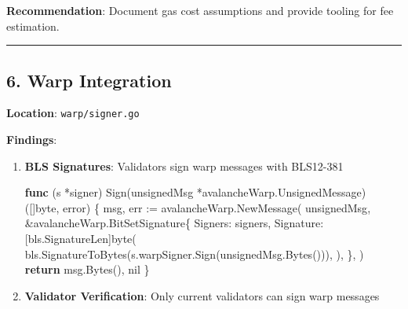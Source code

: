\documentclass[
]{article}
\newenvironment{Shaded}{}{}
\newcommand{\ControlFlowTok}[1]{\textcolor[rgb]{0.00,0.44,0.13}{\textbf{#1}}}
\newcommand{\DataTypeTok}[1]{\textcolor[rgb]{0.56,0.13,0.00}{#1}}
\newcommand{\KeywordTok}[1]{\textcolor[rgb]{0.00,0.44,0.13}{\textbf{#1}}}
\newcommand{\NormalTok}[1]{#1}
\newcommand{\OperatorTok}[1]{\textcolor[rgb]{0.40,0.40,0.40}{#1}}
\newcommand{\OtherTok}[1]{\textcolor[rgb]{0.00,0.44,0.13}{#1}}
\begin{document}
\textbf{Recommendation}: Document gas cost assumptions and provide
tooling for fee estimation.

\begin{center}\rule{0.5\linewidth}{0.5pt}\end{center}

\subsection{6. Warp Integration}\label{6-warp-integration}

\textbf{Location}: \texttt{warp/signer.go}

\textbf{Findings}:

\begin{enumerate}
\def\labelenumi{\arabic{enumi}.}
\item
  \textbf{BLS Signatures}: Validators sign warp messages with BLS12-381

\begin{Shaded}
\begin{Highlighting}[]
\KeywordTok{func} \OperatorTok{(}\NormalTok{s }\OperatorTok{*}\NormalTok{signer}\OperatorTok{)}\NormalTok{ Sign}\OperatorTok{(}\NormalTok{unsignedMsg }\OperatorTok{*}\NormalTok{avalancheWarp}\OperatorTok{.}\NormalTok{UnsignedMessage}\OperatorTok{)} \OperatorTok{([]}\DataTypeTok{byte}\OperatorTok{,} \DataTypeTok{error}\OperatorTok{)} \OperatorTok{\{}
\NormalTok{    msg}\OperatorTok{,}\NormalTok{ err }\OperatorTok{:=}\NormalTok{ avalancheWarp}\OperatorTok{.}\NormalTok{NewMessage}\OperatorTok{(}
\NormalTok{        unsignedMsg}\OperatorTok{,}
        \OperatorTok{\&}\NormalTok{avalancheWarp}\OperatorTok{.}\NormalTok{BitSetSignature}\OperatorTok{\{}
\NormalTok{            Signers}\OperatorTok{:}\NormalTok{ signers}\OperatorTok{,}
\NormalTok{            Signature}\OperatorTok{:} \OperatorTok{[}\NormalTok{bls}\OperatorTok{.}\NormalTok{SignatureLen}\OperatorTok{]}\DataTypeTok{byte}\OperatorTok{(}
\NormalTok{                bls}\OperatorTok{.}\NormalTok{SignatureToBytes}\OperatorTok{(}\NormalTok{s}\OperatorTok{.}\NormalTok{warpSigner}\OperatorTok{.}\NormalTok{Sign}\OperatorTok{(}\NormalTok{unsignedMsg}\OperatorTok{.}\NormalTok{Bytes}\OperatorTok{())),}
            \OperatorTok{),}
        \OperatorTok{\},}
    \OperatorTok{)}
    \ControlFlowTok{return}\NormalTok{ msg}\OperatorTok{.}\NormalTok{Bytes}\OperatorTok{(),} \OtherTok{nil}
\OperatorTok{\}}
\end{Highlighting}
\end{Shaded}
\item
  \textbf{Validator Verification}: Only current validators can sign warp
  messages
\end{enumerate}
\end{document}
